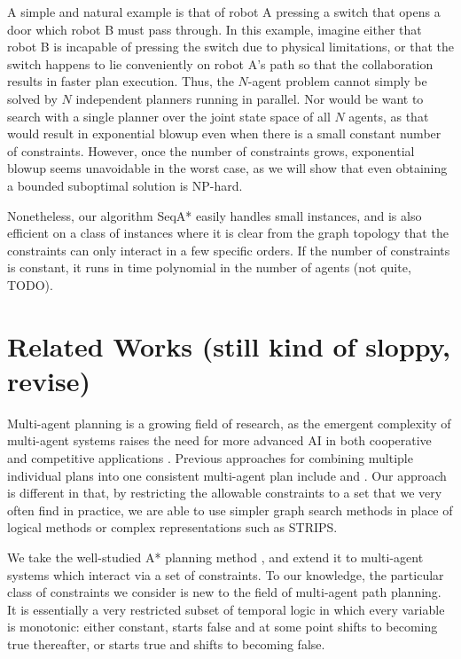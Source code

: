 \documentclass[letterpaper]{article}
\begin{document}
A simple and natural example is that of robot A pressing a switch that opens a door which robot B must pass through. In this example, imagine either that robot B is incapable of pressing the switch due to physical limitations, or that the switch happens to lie conveniently on robot A's path so that the collaboration results in faster plan execution. Thus, the $N$-agent problem cannot simply be solved by $N$ independent planners running in parallel. Nor would be want to search with a single planner over the joint state space of all $N$ agents, as that would result in exponential blowup even when there is a small constant number of constraints. However, once the number of constraints grows, exponential blowup seems unavoidable in the worst case, as we will show that even obtaining a bounded suboptimal solution is NP-hard.

Nonetheless, our algorithm SeqA* easily handles small instances, and is also efficient on a class of instances where it is clear from the graph topology that the constraints can only interact in a few specific orders. If the number of constraints is constant, it runs in time polynomial in the number of agents (not quite, TODO).

\section{Related Works (still kind of sloppy, revise)}

Multi-agent planning is a growing field of research, as the emergent complexity of multi-agent systems raises the need for more advanced AI in both cooperative and competitive applications \cite{van2008multi}. Previous approaches for combining multiple individual plans into one consistent multi-agent plan include \cite{georgeff1988communication} and \cite{de2005multi}. Our approach is different in that, by restricting the allowable constraints to a set that we very often find in practice, we are able to use simpler graph search methods in place of logical methods or complex representations such as STRIPS.

We take the well-studied A* planning method \cite{hart1968formal}, and extend it to multi-agent systems which interact via a set of constraints. To our knowledge, the particular class of constraints we consider is new to the field of multi-agent path planning. It is essentially a very restricted subset of temporal logic \cite{gabbay1994temporal} in which every variable is monotonic: either constant, starts false and at some point shifts to becoming true thereafter, or starts true and shifts to becoming false.
\end{document}
